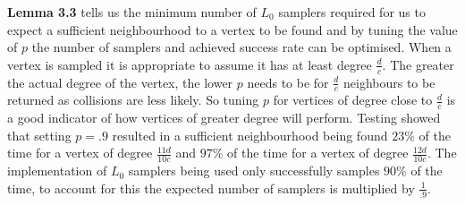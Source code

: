 \documentclass[11pt,twoside,a4paper]{report}
\begin{document}
\vspace{.3cm}\begin{adjustwidth}{.3cm}{}\end{adjustwidth}\vspace{.3cm}

\par \textbf{Lemma 3.3} tells us the minimum number of $L_0$ samplers required for us to expect a sufficient neighbourhood to a vertex to be found and by tuning the value of $p$ the number of samplers and achieved success rate can be optimised. When a vertex is sampled it is appropriate to assume it has at least degree $\frac{d}c$. The greater the actual degree of the vertex, the lower $p$ needs to be for $\frac{d}c$ neighbours to be returned as collisions are less likely. So tuning $p$ for vertices of degree close to $\frac{d}c$ is a good indicator of how vertices of greater degree will perform. Testing showed that setting $p=.9$ resulted in a sufficient neighbourhood being found $23\%$ of the time for a vertex of degree $\frac{11d}{10c}$ and $97\%$ of the time for a vertex of degree $\frac{12d}{10c}$. The implementation of $L_0$ samplers being used only successfully samples $90\%$ of the time, to account for this the expected number of samplers is multiplied by $\frac{1}{.9}$.
\end{document}
